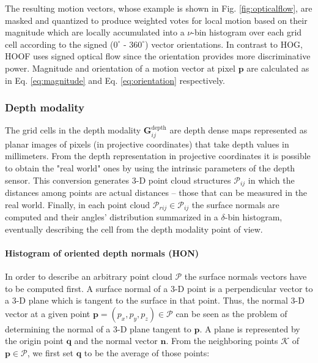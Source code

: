 \documentclass[10pt,twocolumn,letterpaper]{article}
\begin{document}
 The resulting motion vectors, whose example is shown in Fig. \ref{fig:opticalflow}, are masked and quantized to produce weighted votes for local motion based on their magnitude which are locally accumulated into a $\nu$-bin histogram over each grid cell according to the signed ($0^\circ$ - $360^\circ$) vector orientations. In contrast to HOG, HOOF uses signed optical flow since the orientation provides more discriminative power. Magnitude and orientation of a motion vector at pixel $\mathbf{p}$ are calculated as in Eq. \ref{eq:magnitude} and Eq. \ref{eq:orientation} respectively.

\subsubsection{Depth modality}
\label{sssec:depth}

The grid cells in the depth modality $\mathbf{G}_{ij}^\mathrm{depth}$ are depth dense maps represented as planar images of pixels (in projective coordinates) that take depth values in millimeters. From the depth representation in projective coordinates it is possible to obtain the "real world" ones by using the intrinsic parameters of the depth sensor. This conversion generates 3-D point cloud structures $\mathcal{P}_{ij}$ in which the distances among points are actual distances -- those that can be measured in the real world. Finally, in each point cloud $\mathcal{P}_{rij} \in \mathcal{P}_{ij}$ the surface normals are computed and their angles' distribution summarized in a $\delta$-bin histogram, eventually describing the cell from the depth modality point of view.

\paragraph{Histogram of oriented depth normals (HON)} 
In order to describe an arbitrary point cloud $\mathcal{P}$ the surface normals vectors have to be computed first. A surface normal of a 3-D point is a perpendicular vector to a 3-D plane which is tangent to the surface in that point. Thus, the normal 3-D vector at a given point $\mathbf{p} = (p_x, p_y, p_z) \in \mathcal{P}$ can be seen as the problem of determining the normal of a 3-D plane tangent to $\mathbf{p}$. A plane is represented by the origin point $\mathbf{q}$ and the normal vector $\mathbf{n}$. From the neighboring points $\mathcal{K}$ of $\mathbf{p} \in \mathcal{P}$, we first set $\mathbf{q}$ to be the average of those points:
\end{document}
